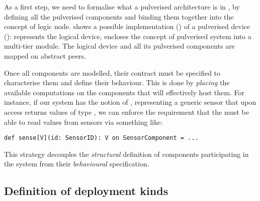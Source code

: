 

As a first step, we need to formalise what a pulverised architecture is in \scalaloci{},
by defining all the pulverised components and binding them together into the concept of logic node.
%
 shows a possible \scalaloci{} implementation () of a pulverised device ():
 represents the logical device,
 encloses the concept of pulverised system into a multi-tier module.
%
The logical device and all its pulverised components are mapped on abstract peers.
%

Once all components are modelled,
their contract must be specified to characterise them and define their behaviour.
%
This is done by \emph{placing} the available computations on the components that will effectively host them.
%
For instance, if our system has the notion of ,
representing a generic sensor that upon access returns values of type ,
we can enforce the requirement that the  must be able to read values from sensors via something like: 
\begin{verbatim}
def sense[V](id: SensorID): V on SensorComponent = ...
\end{verbatim}
%
This strategy decouples the \emph{structural} definition of components participating in the system from their \emph{behavioural} specification.

\subsection{Definition of deployment kinds}



